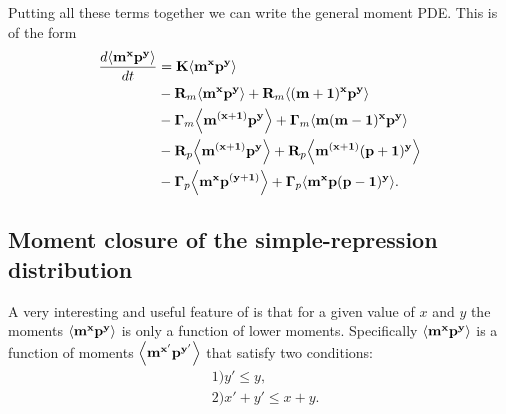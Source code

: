 Putting all these terms together we can write the general moment PDE. This is
of the form
\begin{equation}
  \begin{aligned}
    {d{\mathbf{\left\langle m^x p^y \right\rangle}} \over dt} &=
    \mathbf{K} \mathbf{\left\langle m^x p^y \right\rangle}\\
    &- \mathbf{R}_m \mathbf{\left\langle m^x p^y \right\rangle} + \mathbf{R}_m \mathbf{\left\langle (m+1)^x p^y \right\rangle}\\
    &- \mathbf{\Gamma}_m \mathbf{\left\langle m^{(x + 1)} p^y \right\rangle} + \mathbf{\Gamma}_m \mathbf{\left\langle m (m - 1)^x p^y \right\rangle}\\
    &- \mathbf{R}_p \mathbf{\left\langle m^{(x + 1)} p^y \right\rangle} + \mathbf{R}_p \mathbf{\left\langle m^{(x + 1)} (p + 1)^y \right\rangle}\\
    &- \mathbf{\Gamma}_p \mathbf{\left\langle m^x p^{(y + 1)} \right\rangle} + \mathbf{\Gamma}_p \mathbf{\left\langle m^x p (p - 1)^y \right\rangle}.
  \end{aligned}
  \label{seq_mom_ode}
\end{equation}

\subsection{Moment closure of the simple-repression distribution}

A very interesting and useful feature of  is that for a given
value of $x$ and $y$ the moments $\mathbf{\left\langle m^x p^y \right\rangle}$ is only a function of lower
moments. Specifically $\mathbf{\left\langle m^x p^y \right\rangle}$ is a function of moments
$\mathbf{\left\langle m^{x'} p^{y'} \right\rangle}$ that satisfy two conditions:
\begin{equation}
  \begin{aligned}
    &1) y' \leq y,\\
  &2) x' + y' \leq x + y.
  \end{aligned}
  \label{seq_mom_conditions}
\end{equation}

